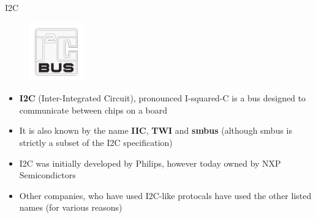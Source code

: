 \begin{frame}
   {I2C}
   \begin{figure}[H]
      \centering
      \includegraphics[height=1in]{IMAGES/I2C-logo}
   \end{figure}
   \begin{itemize}
      \item \textbf{I2C} (Inter-Integrated Circuit), pronounced I-squared-C
	      is a bus designed to communicate between chips on a board
      \item It is also known by the name \textbf{IIC}, \textbf{TWI} and \textbf{smbus}
	      (although smbus is strictly a subset of the I2C specification)
      \item I2C was initially developed by Philips,
	      however today owned by NXP Semicondictors
      \item Other companies, who have used I2C-like protocals have used the
	      other listed names (for various reasons)
   \end{itemize}
\end{frame}

\cprotect\note{

}

